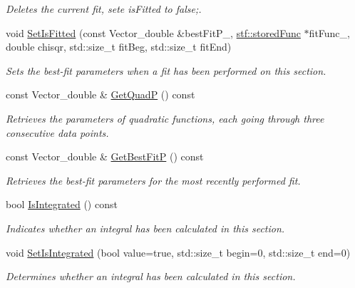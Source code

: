 \begin{DoxyCompactItemize}
\begin{DoxyCompactList}\small\item\em Deletes the current fit, sete isFitted to false;. \item\end{DoxyCompactList}\item 
void \hyperlink{classSection_a29a599defe60ea0389148978419cc6f0}{SetIsFitted} (const Vector\_\-double \&bestFitP\_\-, \hyperlink{structstf_1_1storedFunc}{stf::storedFunc} $\ast$fitFunc\_\-, double chisqr, std::size\_\-t fitBeg, std::size\_\-t fitEnd)
\begin{DoxyCompactList}\small\item\em Sets the best-\/fit parameters when a fit has been performed on this section. \item\end{DoxyCompactList}\item 
const Vector\_\-double \& \hyperlink{classSection_adba74fc36543f90d9a4441f1dd2fe544}{GetQuadP} () const 
\begin{DoxyCompactList}\small\item\em Retrieves the parameters of quadratic functions, each going through three consecutive data points. \item\end{DoxyCompactList}\item 
const Vector\_\-double \& \hyperlink{classSection_ac42014aaa369eb14375f5a2ae1d85696}{GetBestFitP} () const 
\begin{DoxyCompactList}\small\item\em Retrieves the best-\/fit parameters for the most recently performed fit. \item\end{DoxyCompactList}\item 
bool \hyperlink{classSection_a48cd4ca1fc664cbbee27bdaf9d7e1899}{IsIntegrated} () const 
\begin{DoxyCompactList}\small\item\em Indicates whether an integral has been calculated in this section. \item\end{DoxyCompactList}\item 
void \hyperlink{classSection_a8e69591a80dc21c7ecba523ae15eec3d}{SetIsIntegrated} (bool value=true, std::size\_\-t begin=0, std::size\_\-t end=0)
\begin{DoxyCompactList}\small\item\em Determines whether an integral has been calculated in this section. \item\end{DoxyCompactList}\item 

\end{DoxyCompactItemize}
